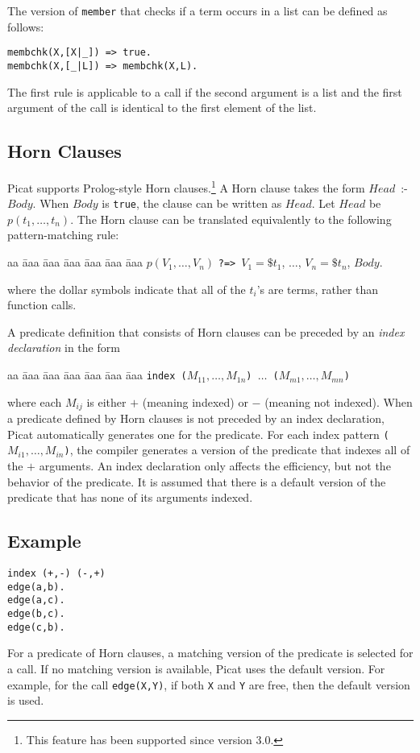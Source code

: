The version of \texttt{member} that checks if a term occurs in a list can be defined as follows:
\begin{verbatim}
membchk(X,[X|_]) => true.
membchk(X,[_|L]) => membchk(X,L).
\end{verbatim}
The first rule is applicable to a call if the second argument is a list and the first argument of the call is identical to the first element of the list.

\subsection*{\label{section:horn}Horn Clauses}
Picat supports Prolog-style Horn clauses.\footnote{This feature has been supported since version 3.0.} A Horn clause takes the form $Head$\ :-\ $Body$. When $Body$ is \texttt{true}, the clause can be written as $Head$. Let $Head$ be $p(t_1,\ldots,t_n)$. The Horn clause can be translated equivalently to the following pattern-matching rule:
\begin{tabbing}
aa \= aaa \= aaa \= aaa \= aaa \= aaa \= aaa \kill
\> $p(V_1,\ldots,V_n)$ \verb+?=>+\ $V_1 = \$t_1$, $\ldots$, $V_n = \$t_n$, $Body$.
\end{tabbing}
where the dollar symbols indicate that all of the $t_i$'s are terms, rather than function calls.

A predicate definition that consists of Horn clauses can be preceded by an \emph{index declaration} in the form
\begin{tabbing}
aa \= aaa \= aaa \= aaa \= aaa \= aaa \= aaa \kill
\> \texttt{index ($M_{11},\ldots,M_{1n}$) $\ldots$ ($M_{m1},\ldots,M_{mn}$)}
\end{tabbing}
where each $M_{ij}$ is either $+$ (meaning indexed) or $-$ (meaning not indexed). When a predicate defined by Horn clauses is not preceded by an index declaration, Picat automatically generates one for the predicate. For each index pattern \texttt{($M_{i1},\ldots,M_{in}$)}, the compiler generates a version of the predicate that indexes all of the $+$ arguments. An index declaration only affects the efficiency, but not the behavior of the predicate. It is assumed that there is a default version of the predicate that has none of its arguments indexed.


\subsection*{Example}
\begin{verbatim}
index (+,-) (-,+)
edge(a,b).
edge(a,c).
edge(b,c).
edge(c,b).
\end{verbatim}
For a predicate of Horn clauses, a matching version of the predicate is selected for a call. If no matching version is available, Picat uses the default version. For example, for the call \texttt{edge(X,Y)}, if both \texttt{X} and \texttt{Y} are free, then the default version is used.

